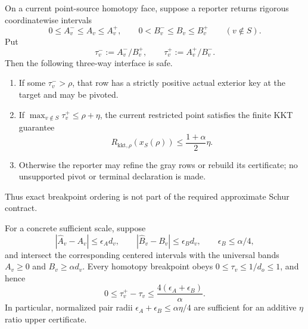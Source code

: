 \begin{corollary}
\label{cor:aesp-cd-ratio-pivot-interval-interface}
On a current point-source homotopy face, suppose a reporter returns rigorous
coordinatewise intervals
\begin{equation*}
 0\leq A_v^-\leq A_v\leq A_v^+,
 \qquad
 0<B_v^-\leq B_v\leq B_v^+
 \qquad(v\notin S).
\end{equation*}
Put
\begin{equation*}
 \tau_v^-:=A_v^-/B_v^+,
 \qquad
 \tau_v^+:=A_v^+/B_v^-.
\end{equation*}
Then the following three-way interface is safe.
\begin{enumerate}
\item If some \(\tau_v^->\rho\), that row has a strictly positive actual
  exterior key at the target and may be pivoted.
\item If \(\max_{v\notin S}\tau_v^+\leq\rho+\eta\), the current restricted
  point satisfies the finite KKT guarantee
  \begin{equation*}
   R_{\mathrm{kkt},\rho}(x_S(\rho))
   \leq\frac{1+\alpha}{2}\eta.
  \end{equation*}
\item Otherwise the reporter may refine the gray rows or rebuild its
  certificate; no unsupported pivot or terminal declaration is made.
\end{enumerate}
Thus exact breakpoint ordering is not part of the required approximate
Schur contract.

For a concrete sufficient scale, suppose
\begin{equation*}
 |\widehat A_v-A_v|\leq\epsilon_A d_v,
 \qquad
 |\widehat B_v-B_v|\leq\epsilon_B d_v,
 \qquad
 \epsilon_B\leq\alpha/4,
\end{equation*}
and intersect the corresponding centered intervals with the universal bands
\(A_v\geq0\) and \(B_v\geq\alpha d_v\).  Every homotopy breakpoint obeys
\(0\leq\tau_v\leq1/d_o\leq1\), and hence
\begin{equation}
 0\leq\tau_v^+-\tau_v
 \leq\frac{4(\epsilon_A+\epsilon_B)}{\alpha}.
 \label{eq:aesp-cd-ratio-pivot-interval-width}
\end{equation}
In particular, normalized pair radii
\(\epsilon_A+\epsilon_B\leq\alpha\eta/4\) are sufficient for an additive
\(\eta\) ratio upper certificate.
\end{corollary}

